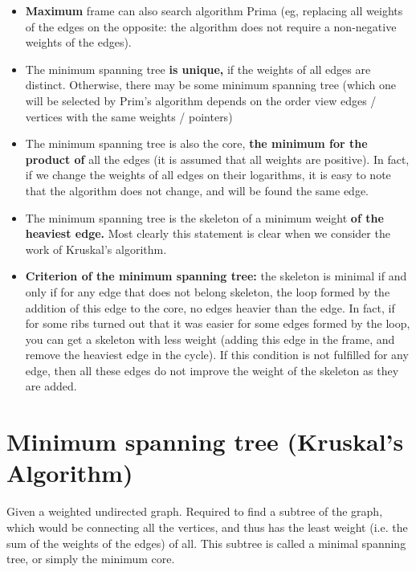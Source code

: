 \begin{itemize}

\item \textbf{Maximum} frame can also search algorithm Prima (eg, replacing all weights of the edges on the opposite: the algorithm does not require a non-negative weights of the edges).

\item The minimum spanning tree \textbf{is unique,} if the weights of all edges are distinct. Otherwise, there may be some minimum spanning tree (which one will be selected by Prim's algorithm depends on the order view edges / vertices with the same weights / pointers)

\item The minimum spanning tree is also the core, \textbf{the minimum for the product of} all the edges (it is assumed that all weights are positive). In fact, if we change the weights of all edges on their logarithms, it is easy to note that the algorithm does not change, and will be found the same edge.

\item The minimum spanning tree is the skeleton of a minimum weight \textbf{of the heaviest edge.} Most clearly this statement is clear when we consider the work of Kruskal's algorithm.

\item \textbf{Criterion of the minimum spanning tree:} the skeleton is minimal if and only if for any edge that does not belong skeleton, the loop formed by the addition of this edge to the core, no edges heavier than the edge. In fact, if for some ribs turned out that it was easier for some edges formed by the loop, you can get a skeleton with less weight (adding this edge in the frame, and remove the heaviest edge in the cycle). If this condition is not fulfilled for any edge, then all these edges do not improve the weight of the skeleton as they are added.

\end{itemize}

\section{ Minimum spanning tree (Kruskal's Algorithm) }
Given a weighted undirected graph. Required to find a subtree of the graph, which would be connecting all the vertices, and thus has the least weight (i.e. the sum of the weights of the edges) of all. This subtree is called a minimal spanning tree, or simply the minimum core.

